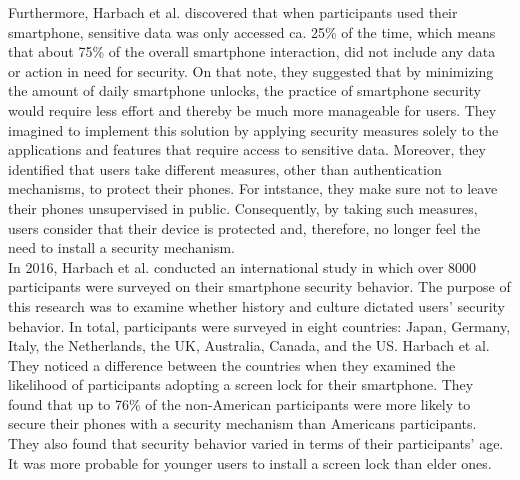 Furthermore, Harbach et al. \cite{harbach} discovered that when participants used their smartphone, sensitive data was only accessed ca. 25\% of the time, which means that about 75\% of the overall smartphone interaction, did not include any data or action in need for security. On that note, they suggested that by minimizing the amount of daily smartphone unlocks, the practice of smartphone security would require less effort and thereby be much more manageable for users. They imagined to implement this solution by applying security measures solely to the applications and features that require access to sensitive data. Moreover, they identified that users take different measures, other than authentication mechanisms, to protect their phones. For intstance, they make sure not to leave their phones unsupervised in public. Consequently, by taking such measures, users consider that their device is protected and, therefore, no longer feel the need to install a security mechanism. \\

In 2016, Harbach et al. \cite{Harbach:2016} conducted an international study in which over 8000 participants were surveyed on their smartphone security behavior. The purpose of this research was to examine whether history and culture dictated users' security behavior. In total, participants were surveyed in eight countries: Japan, Germany, Italy, the Netherlands, the UK, Australia, Canada, and the US. Harbach et al. They noticed a difference between the countries when they examined the likelihood of participants adopting a screen lock for their smartphone. They found that up to 76\% of the non-American participants were more likely to secure their phones with a security mechanism than Americans participants. They also found that security behavior varied in terms of their participants' age. It was more probable for younger users to install a screen lock than elder ones.\\

